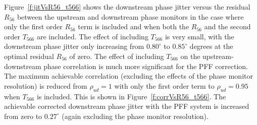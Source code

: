 Figure~\ref{f:jitVsR56_t566} shows the downstream phase jitter versus the residual \(R_{56}\) between the upstream and downstream phase monitors in the case where only the first order \(R_{56}\) term is included and when both the \(R_{56}\) and the second order \(T_{566}\) are included. The effect of including \(T_{566}\) is very small, with the downstream phase jitter only increasing from \(0.80^\circ\) to \(0.85^\circ\) degrees at the optimal residual \(R_{56}\) of zero. The effect of including \(T_{566}\) on the upstream-downstream phase correlation is much more significant for the PFF correction. The maximum achievable correlation (excluding the effects of the phase monitor resolution) is reduced from \(\rho_{ud} = 1\) with only the first order term to \(\rho_{ud} = 0.95\) when \(T_{566}\) is included. This is shown in Figure~\ref{f:corrVsR56_t566}.  The achievable corrected downstream phase jitter with the PFF system is increased from zero to \(0.27^\circ\) (again excluding the phase monitor resolution). 

